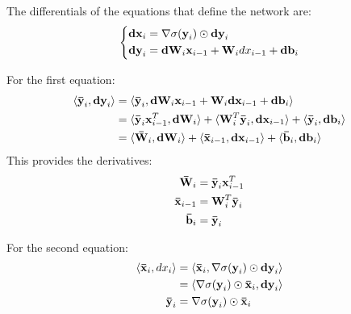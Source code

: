 The differentials of the equations that define the network are:
\begin{equation}
\left\{ \begin{aligned}
\obj{dx}_{i} & = \nabla\sigma(\obj{y}_{i}) \odot \obj{dy}_{i} \\
\obj{dy}_{i} & = \obj{dW}_{i} \obj{x}_{i - 1} + \obj{W}_{i} dx_{i - 1} + \obj{db}_{i}
\end{aligned} \right.
\end{equation}

For the first equation:
\begin{align}
\langle \gradobj{y}_{i}, \obj{dy}_{i} \rangle & = \langle \gradobj{y}_{i}, \obj{dW}_{i} \obj{x}_{i - 1} + \obj{W}_{i} \obj{dx}_{i - 1} + \obj{db}_{i} \rangle \\
& = \langle \gradobj{y}_{i} \obj{x}_{i - 1}^T, \obj{dW}_{i} \rangle + \langle \obj{W}_{i}^T \gradobj{y}_{i}, \obj{dx}_{i - 1} \rangle + \langle \gradobj{y}_{i}, \obj{db}_{i} \rangle \\
& = \langle \gradobj{W}_{i}, \obj{dW}_{i} \rangle + \langle \gradobj{x}_{i-1}, \obj{dx}_{i-1} \rangle + \langle \gradobj{b}_{i}, \obj{db}_{i} \rangle
\end{align}
This provides the derivatives:
\begin{align}
\gradobj{W}_{i} & = \gradobj{y}_{i} \obj{x}_{i - 1}^T \\
\gradobj{x}_{i - 1} & = \obj{W}_{i}^T \gradobj{y}_{i} \\
\gradobj{b}_{i} & = \gradobj{y}_{i}
\end{align}

For the second equation:
\begin{align}
\langle \gradobj{x}_{i}, dx_{i} \rangle & = \langle \gradobj{x}_{i}, \nabla\sigma(\obj{y}_{i}) \odot \obj{dy}_{i} \rangle \\
& = \langle \nabla\sigma(\obj{y}_{i}) \odot \gradobj{x}_{i}, \obj{dy}_{i} \rangle \\
\gradobj{y}_{i} & = \nabla\sigma(\obj{y}_{i}) \odot \gradobj{x}_{i}
\end{align}
